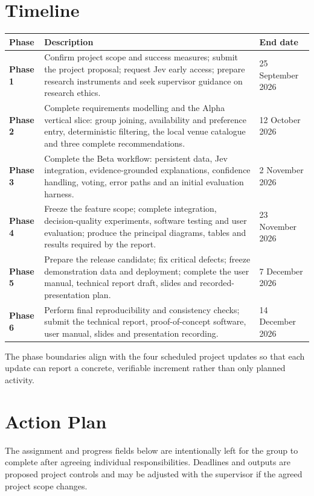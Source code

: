\documentclass[12pt,a4paper]{article}
\begin{document}
\section*{Timeline}

\begin{longtable}{>{\bfseries}p{}p{}p{}}
  \toprule
  Phase & Description & End date \\
  \midrule
  \endhead
  Phase 1 & Confirm project scope and success measures; submit the project proposal; request Jev early access; prepare research instruments and seek supervisor guidance on research ethics. & 25 September 2026 \\
  \midrule
  Phase 2 & Complete requirements modelling and the Alpha vertical slice: group joining, availability and preference entry, deterministic filtering, the local venue catalogue and three complete recommendations. & 12 October 2026 \\
  \midrule
  Phase 3 & Complete the Beta workflow: persistent data, Jev integration, evidence-grounded explanations, confidence handling, voting, error paths and an initial evaluation harness. & 2 November 2026 \\
  \midrule
  Phase 4 & Freeze the feature scope; complete integration, decision-quality experiments, software testing and user evaluation; produce the principal diagrams, tables and results required by the report. & 23 November 2026 \\
  \midrule
  Phase 5 & Prepare the release candidate; fix critical defects; freeze demonstration data and deployment; complete the user manual, technical report draft, slides and recorded-presentation plan. & 7 December 2026 \\
  \midrule
  Phase 6 & Perform final reproducibility and consistency checks; submit the technical report, proof-of-concept software, user manual, slides and presentation recording. & 14 December 2026 \\
  \bottomrule
\end{longtable}

The phase boundaries align with the four scheduled project updates so that each update can report a concrete, verifiable increment rather than only planned activity.

\section*{Action Plan}

The assignment and progress fields below are intentionally left for the group to complete after agreeing individual responsibilities. Deadlines and outputs are proposed project controls and may be adjusted with the supervisor if the agreed project scope changes.
\end{document}
